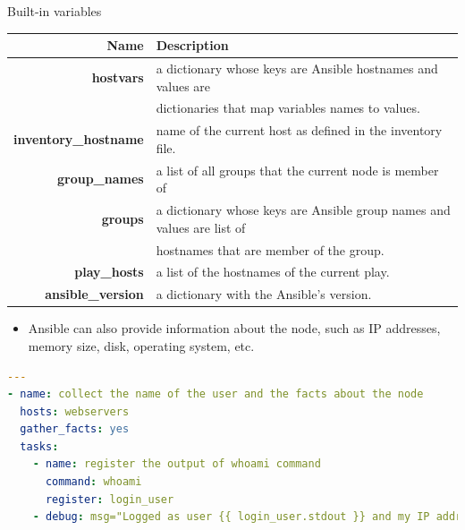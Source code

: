 \documentclass[xcolor=dvipsnames,slidestop, mathserif]{beamer}
\begin{document}
\begin{frame}[fragile]{Built-in variables}
\vspace{-0.8cm}
\begin{table}
\scriptsize
{
  \begin{tabular}{rl}
    \hline \textbf{Name} & \textbf{Description} \\ \hline
    \textbf{hostvars} & a dictionary whose keys are Ansible hostnames and values are \\
    & dictionaries that map variables names to values. \\
    \textbf{inventory\_hostname} & name of the current host as defined in the inventory file.\\
    \textbf{group\_names} & a list of all groups that the current node is member of \\
    \textbf{groups} & a dictionary whose keys are Ansible group names and values are list of \\
    & hostnames that are member of the group. \\
    \textbf{play\_hosts} & a list of the hostnames of the current play. \\
    \textbf{ansible\_version} & a dictionary with the Ansible's version. \\
    \hline
  \end{tabular} 
}
\end{table}
\scriptsize
\vspace{-0.3cm}
\begin{itemize}
  \item Ansible can also provide information about the node, such as IP addresses, memory size, disk, operating system, etc.
  \end{itemize}

\begin{lstlisting}[language=yaml,frame=tb]
---
- name: collect the name of the user and the facts about the node
  hosts: webservers
  gather_facts: yes
  tasks:
    - name: register the output of whoami command
      command: whoami
      register: login_user
    - debug: msg="Logged as user {{ login_user.stdout }} and my IP address is {{ hostvars[groups['webservers'][0]]['ansible_eth1']['ipv4']['address'] }}"
\end{lstlisting}

\end{frame}
\end{document}
